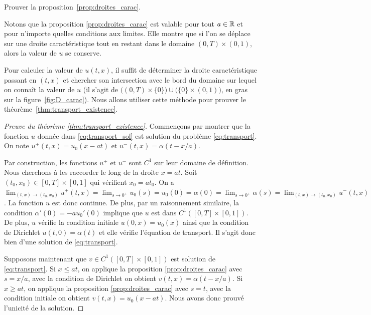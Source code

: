 \documentclass[12pt,a4paper,twoside]{article}
\begin{document}
\begin{exercise}
  Prouver la proposition~\ref{prop:droites_carac}.
\end{exercise}


Notons que la proposition \ref{prop:droites_carac} est valable pour tout $a \in \mathbb{R}$
et pour n'importe quelles conditions aux limites. 
Elle montre que si l'on se d\'eplace sur une droite caract\'eristique
tout en restant dans le domaine $(0,T) \times (0,1)$, alors la valeur
de $u$ se conserve.


Pour calculer la valeur de $u(t,x)$, il suffit de d\'eterminer la droite caract\'eristique passant
en $(t,x)$ et chercher son intersection avec le bord du domaine sur lequel on conna\^it
la valeur de $u$ (il s'agit de $\big((0,T) \times \{0\}\big) \cup \big( \{0\} \times (0,1)\big)$,
en gras sur la figure~\ref{fig:D_carac}).
Nous allons utiliser cette m\'ethode pour prouver
le th\'eor\`eme~\ref{thm:transport_existence}.

\begin{proof}[Preuve du th\'eor\`eme \ref{thm:transport_existence}]
  Commen\c{c}ons par montrer que la fonction $u$ donn\'ee dans \eqref{eq:transport_sol}
  est solution du probl\`eme \eqref{eq:transport}.
  On note $u^+(t,x) = u_0(x-at)$ et $u^-(t,x) = \alpha(t-x/a)$.

  Par construction, les fonctions $u^+$ et $u^-$ sont $C^1$ sur leur domaine de 
  d\'efinition. Nous cherchons \`a les raccorder le long de la droite $x=at$.
  Soit $(t_0,x_0) \in [0,T] \times [0,1]$ qui v\'erifient $x_0 = at_0$.
  On a $\lim_{(t,x) \to (t_0,x_0)} u^+(t,x) = \lim_{s \to 0^+} u_0(s) = u_0(0)
  = \alpha(0) = \lim_{s \to 0^+} \alpha(s) = \lim_{(t,x) \to (t_0,x_0)} u^-(t,x)$.
  La fonction $u$ est donc continue.
  De plus, par un raisonnement similaire, la condition $\alpha'(0) = -au_0'(0)$
  implique que $u$ est dans $C^1([0,T]\times [0,1])$.
  De plus, $u$ v\'erifie la condition initiale $u(0,x) = u_0(x)$ ainsi que la condition
  de Dirichlet $u(t,0) = \alpha(t)$ et elle v\'erifie l'\'equation de transport.
  Il s'agit donc bien d'une solution de \eqref{eq:transport}.

  Supposons maintenant que $v \in C^1([0,T] \times [0,1])$ est solution de
  \eqref{eq:transport}.
  Si $x \leq a t$, on applique la proposition \ref{prop:droites_carac}
  avec $s=x/a$, avec la condition de Dirichlet
  on obtient $v(t,x) = \alpha(t-x/a)$.
  Si $x \geq a t$, on applique la proposition \ref{prop:droites_carac}
  avec $s=t$, avec la condition initiale on obtient $v(t,x) = u_0(x-at)$.
  Nous avons donc prouv\'e l'unicit\'e de la solution.
\end{proof}
\end{document}
